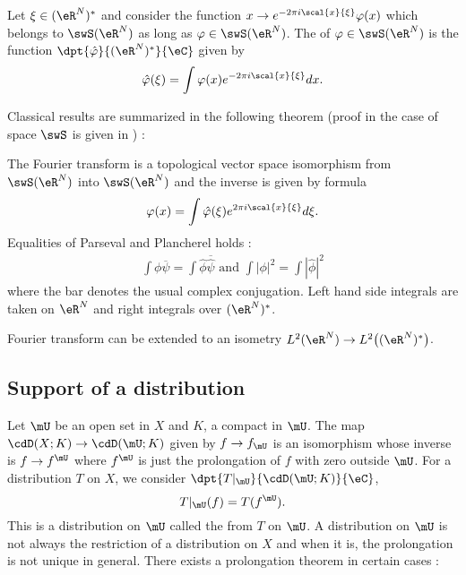 Let $\xi\in(\eR^N)^*$ and consider the function  $x\to e^{-2\pi i\scal{x}{\xi}}\varphi(x)$
which belongs to $\swS(\eR^N)$ as long as $\varphi\in\swS(\eR^N)$. The  of $\varphi\in\swS(\eR^N)$ is the function $\dpt{\hat\varphi}{(\eR^N)^*}{\eC}$ given by
\begin{equation}
\hat\varphi(\xi)=\int \varphi(x)e^{-2\pi i\scal{x}{\xi}}dx.
\end{equation}

Classical results are summarized in the following theorem (proof in the case of space $\swS$ is given in \cite{Treves}) :

\begin{theorem}
The Fourier transform is a topological vector space isomorphism from $\swS(\eR^N)$ into $\swS(\eR^N)$ and the inverse is given by formula
\[ 
  \varphi(x)=\int \hat\varphi(\xi)e^{2\pi i\scal{x}{\xi}}d\xi.
\]
Equalities of Parseval and Plancherel holds :
\begin{align}
  \int \phi\overline{\psi}=\int \hat\phi\overline{\hat\psi}\textrm{ and }
\int| \phi |^2=\int| \hat\phi |^2
\end{align}
where the bar denotes the usual complex conjugation. Left hand side integrals are taken on $\eR^N$ and right integrals over $(\eR^N)^*$.
\end{theorem}

\begin{corollary}
Fourier transform can be extended to an isometry $L^2(\eR^N)\to L^2\big( (\eR^N)^* \big)$.
\end{corollary}

\subsection{Support of a distribution}

Let $\mU$ be an open set in $X$ and $K$, a compact in $\mU$. The map $\cdD(X;K)\to\cdD(\mU;K)$ given by $f\to f_{\mU}$ is an isomorphism whose inverse is $f\to f^{\mU}$ where $f^{\mU}$ is just the prolongation of $f$ with zero outside $\mU$. For a distribution $T$ on $X$, we consider $\dpt{T|_{\mU}}{\cdD(\mU;K)}{\eC}$,
\[ 
         T|_{\mU}(f)=T(f^{\mU}).
\]
This is a distribution on $\mU$ called the  from $T$ on $\mU$. A distribution on $\mU$ is not always the restriction of a distribution on $X$ and when it is, the prolongation is not unique in general. There exists a prolongation theorem in certain cases :

